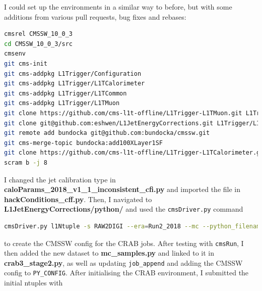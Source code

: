 I could set up the environments in a similar way to before, but with some additions from various pull requests, bug fixes and rebases:

\begin{lstlisting}[belowskip=-0.7cm, language=sh, numbers=none]
cmsrel CMSSW_10_0_3
cd CMSSW_10_0_3/src
cmsenv
git cms-init
git cms-addpkg L1Trigger/Configuration
git cms-addpkg L1Trigger/L1TCalorimeter
git cms-addpkg L1Trigger/L1TCommon
git cms-addpkg L1Trigger/L1TMuon
git clone https://github.com/cms-l1t-offline/L1Trigger-L1TMuon.git L1Trigger/L1TMuon/data
git clone git@github.com:eshwen/L1JetEnergyCorrections.git L1Trigger/L1JetEnergyCorrections
git remote add bundocka git@github.com:bundocka/cmssw.git
git cms-merge-topic bundocka:add100XLayer1SF
git clone https://github.com/cms-l1t-offline/L1Trigger-L1TCalorimeter.git L1Trigger/L1TCalorimeter/data
scram b -j 8
\end{lstlisting}

I changed the jet calibration type in \textbf{caloParams\_2018\_v1\_1\_inconsistent\_cfi.py} and imported the file in \textbf{hackConditions\_cff.py}. Then, I navigated to \textbf{L1JetEnergyCorrections/python/} and used the \texttt{cmsDriver.py} command

\begin{lstlisting}[belowskip=-0.7cm, language=sh, numbers=none]
cmsDriver.py l1Ntuple -s RAW2DIGI --era=Run2_2018 --mc --python_filename=l1NtupleMcMaker2018_RAW2DIGI_v1.py --no_output -n 202 --conditions=100X_upgrade2018_realistic_v11 --customise=L1Trigger/Configuration/customiseReEmul.L1TReEmulMCFromRAWSimHcalTP --customise=L1Trigger/L1TNtuples/customiseL1Ntuple.L1NtupleRAWEMUGEN_MC --customise=L1Trigger/Configuration/customiseSettings.L1TSettingsToCaloParams_2018_v1_1_inconsistent --custom_conditions=HcalChannelQuality_2018_v3.0_mc,HcalChannelQualityRcd,frontier://FrontierProd/CMS_CONDITIONS --filein=/store/mc/RunIISpring18DR/QCD_Pt-15to3000_TuneCP5_Flat_13TeV_pythia8/GEN-SIM-RAW/NZSPU0to70_100X_upgrade2018_realistic_v10-v1/100000/00818B45-1522-E811-910B-1866DAEA7E64.root
\end{lstlisting}

to create the CMSSW config for the CRAB jobs. After testing with \texttt{cmsRun}, I then added the new dataset to \textbf{mc\_samples.py} and linked to it in \textbf{crab3\_stage2.py}, as well as updating \texttt{job\_append} and adding the CMSSW config to \texttt{PY\_CONFIG}. After initialising the CRAB environment, I submitted the initial ntuples with

